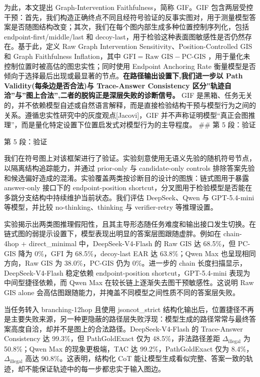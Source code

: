 \documentclass[
  11pt,
]{article}
\begin{document}
为此，本文提出 Graph-Intervention Faithfulness，简称 GIF。GIF
包含两层受控干预：首先，我们构造正确终点不同且经符号验证的反事实图对，用于测量模型答案是否随图结构改变；其次，我们在每个图内部生成多种位置控制序列化，包括
endpoint-first/middle/last 和
decoy-last，用于检验这种表面图敏感性是否仍然存在。基于此，定义 Raw Graph
Intervention Sensitivity、Position-Controlled GIS 和 Graph Faithfulness
Inflation，其中 \(\text{GFI} = \text{Raw GIS} - \text{PC-GIS}\)
，用于量化未控制位置时被高估的图忠实性；同时使用 Endpoint Anchoring Rate
衡量模型是否倾向于选择最后出现或最显著的节点。\textbf{在路径输出设置下,我们进一步以
Path Validity(每条边是否合法)与 Trace-Answer Consistency
区分''轨迹自洽''与''图上合法'',二者的脱钩正是深层失败的诊断信号。} GIF
是黑箱、任务无关的，并不依赖模型自述或自然语言解释，而是直接检验结构干预与模型行为之间的关系。遵循忠实性研究中的灰度观点{[}Jacovi{]}，GIF
并不声称证明模型``真正会图推理''，而是量化特定设置下位置启发式对模型行为的主导程度。
\#\# 第 5 段：验证

第 5 段：验证

我们在符号图上对该框架进行了验证。实验刻意使用无语义先验的随机符号节点，以隔离结构追踪能力，并通过
prior-only 与 candidate-only controls
排除答案先验和候选偏好造成的混淆。实验覆盖两类按诊断目的设计的图族：链式图用于暴露
answer-only 接口下的 endpoint-position
shortcut，分叉图用于检验模型是否能在多跳分支结构中持续维护当前状态。我们评估
DeepSeek、Qwen 与 GPT-5.4-mini 等模型，并比较 no-thinking、thinking 与
verifier-retry 等推理设置。

实验揭示出两类图推理假阳性，且其主导形态随任务难度和输出接口发生切换。在链式图的弱提示设置下，模型表现出明显的答案层图跟随虚胖。例如在
chain-4hop + direct\_minimal 中，DeepSeek-V4-Flash 的 Raw GIS 达
68.5\%，但 PC-GIS 降为 0\%，GFI 为 68.5\%，decoy-last EAR 达
63.8\%；Qwen Max 也呈现相同方向，Raw GIS 为 38.0\%，PC-GIS 仍为
0\%。进一步的 chain 长度扫描显示，DeepSeek-V4-Flash 稳定依赖
endpoint-position shortcut，GPT-5.4-mini 表现为中间型捷径依赖，而 Qwen
Max 在较长链上逐渐失去图干预敏感性。这说明 Raw GIS alone
会高估图跟随能力，并掩盖不同模型之间性质不同的答案层失败。

当任务转入 branching-12hop 且使用 jsoncot\_strict
结构化输出后，位置捷径不再是主要失败来源，另一种更隐蔽的路径层失败浮现：模型生成的路径常常与最终答案高度自洽，却并不是图上的合法路径。DeepSeek-V4-Flash
的 Trace-Answer Consistency 达 99.3\%，但 PathGoldExact 仅为
48.5\%，非法路径差距 \(\Delta_{\text{illegal}}\) 为 50.8\%；Qwen Max
的现象更极端，TAC 达 99.2\%，PathGoldExact 仅为
8.4\%，\(\Delta_{\text{illegal}}\) 高达 90.8\%。这表明，结构化 CoT
能让模型生成看似完整、答案一致的轨迹，却不能保证轨迹中的每一步都忠实于输入图边。
\end{document}
